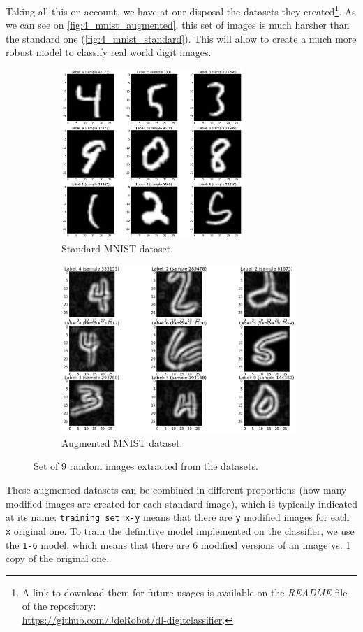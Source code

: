 			Taking all this on account, we have at our disposal the datasets they created\footnote{A link to download them for future usages is available on the \emph{README} file of the repository:\\ \url{https://github.com/JdeRobot/dl-digitclassifier}.}. As we can see on \autoref{fig:4_mnist_augmented}, this set of images is much harsher than the standard one (\autoref{fig:4_mnist_standard}). This will allow to create a much more robust model to classify real world digit images.\\



			\begin{figure}[h]
				\centering
				\begin{subfigure}[h]{0.45\linewidth}
					\centering
					\includegraphics[width=2.7in]{images/training}
					\caption{Standard MNIST dataset.}
					\label{fig:4_mnist_standard}
				\end{subfigure}
				\qquad
				\begin{subfigure}[h]{0.45\linewidth}
					\centering
					\includegraphics[width=3.5in]{images/training_augm}
					\caption{Augmented MNIST dataset.}
					\label{fig:4_mnist_augmented}
				\end{subfigure}
				\label{fig:4_mnist}
				\caption{Set of 9 random images extracted from the datasets.}
			\end{figure}


			These augmented datasets can be combined in different proportions (how many modified images are created for each standard image), which is typically indicated at its name: \texttt{training set x-y} means that there are \texttt{y} modified images for each \texttt{x} original one. To train the definitive model implemented on the classifier, we use the \texttt{1-6} model, which means that there are 6 modified versions of an image vs. 1 copy of the original one.

